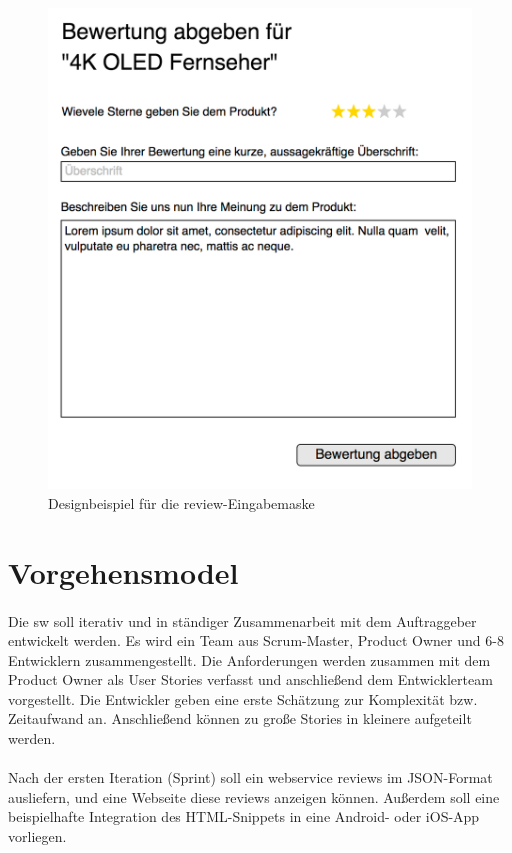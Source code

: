 \documentclass{article}
\begin{document}
\begin{figure}[h]
  \centering
  \includegraphics[scale=.3]{review-enter-snippet.png}
  \caption{Designbeispiel für die \gls{review}-Eingabemaske}
  \label{}
\end{figure}

\section{Vorgehensmodel}
\paragraph{}
Die \gls{sw} soll iterativ und in ständiger Zusammenarbeit mit dem Auftraggeber entwickelt werden. Es wird ein Team aus Scrum-Master, Product Owner und 6-8 Entwicklern zusammengestellt. Die Anforderungen werden zusammen mit dem Product Owner als User Stories verfasst und anschließend dem Entwicklerteam vorgestellt. Die Entwickler geben eine erste Schätzung zur Komplexität bzw. Zeitaufwand an. Anschließend können zu große Stories in kleinere aufgeteilt werden.
\paragraph{}
Nach der ersten Iteration (Sprint) soll ein \gls{webservice} \gls{review}s im JSON-Format ausliefern, und eine Webseite diese \gls{review}s anzeigen können. Außerdem soll eine beispielhafte Integration des HTML-Snippets in eine Android- oder iOS-App vorliegen.
\end{document}
